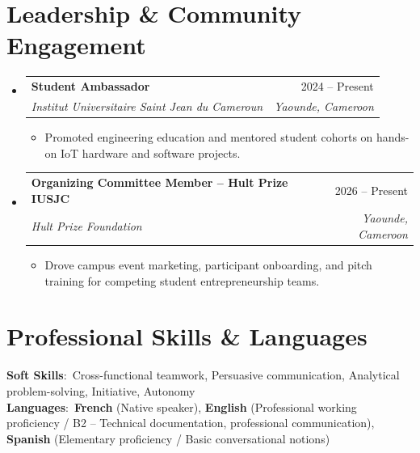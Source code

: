 \documentclass[letterpaper,10pt]{article}
\makeatletter
\newcommand{\resumeItem}[1]{
  \item\small{
    {#1 \vspace{-1.5pt}}
  }
}
\newcommand{\resumeSubheading}[4]{
  \vspace{-1pt}\item
    \begin{tabular*}{0.98\textwidth}[t]{l@{\extracolsep{\fill}}r}
      \textbf{#1} & #2 \\
      \textit{\small#3} & \textit{\small #4} \\
    \end{tabular*}\vspace{-5pt}
}
\newcommand{\resumeSubHeadingListStart}{\begin{itemize}[leftmargin=0.15in, label={}]}
\newcommand{\resumeSubHeadingListEnd}{\end{itemize}}
\newcommand{\resumeItemListStart}{\begin{itemize}[leftmargin=0.2in, label={$\vcenter{\hbox{\tiny$\bullet$}}$}, itemsep=1.2pt, parsep=0pt]}
\newcommand{\resumeItemListEnd}{\end{itemize}\vspace{-3pt}}
\makeatother
\begin{document}
\section{Leadership \& Community Engagement}
  \resumeSubHeadingListStart
    \resumeSubheading
      {Student Ambassador}{2024 -- Present}
      {Institut Universitaire Saint Jean du Cameroun}{Yaounde, Cameroon}
      \resumeItemListStart
        \resumeItem{Promoted engineering education and mentored student cohorts on hands-on IoT hardware and software projects.}
      \resumeItemListEnd
    \resumeSubheading
      {Organizing Committee Member -- Hult Prize IUSJC}{2026 -- Present}
      {Hult Prize Foundation}{Yaounde, Cameroon}
      \resumeItemListStart
        \resumeItem{Drove campus event marketing, participant onboarding, and pitch training for competing student entrepreneurship teams.}
      \resumeItemListEnd
  \resumeSubHeadingListEnd

\section{Professional Skills \& Languages}
\begin{itemize}[leftmargin=0.15in, label={}]
    \small{\item{
     \textbf{Soft Skills}{:\ Cross-functional teamwork, Persuasive communication, Analytical problem-solving, Initiative, Autonomy} \\ \vspace{1.5pt}
     \textbf{Languages}{:\ \textbf{French} (Native speaker), \textbf{English} (Professional working proficiency / B2 -- Technical documentation, professional communication), \textbf{Spanish} (Elementary proficiency / Basic conversational notions)}
    }}
\end{itemize}

\end{document}
